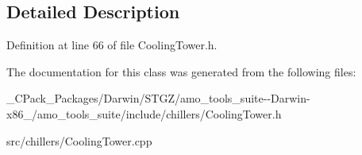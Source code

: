 \subsection{Detailed Description}


Definition at line 66 of file Cooling\+Tower.\+h.



The documentation for this class was generated from the following files\+:\begin{DoxyCompactItemize}
\item 
\+\_\+\+C\+Pack\+\_\+\+Packages/\+Darwin/\+S\+T\+G\+Z/amo\+\_\+tools\+\_\+suite-\/-\/\+Darwin-\/x86\+\_/amo\+\_\+tools\+\_\+suite/include/chillers/Cooling\+Tower.\+h\item 
src/chillers/Cooling\+Tower.\+cpp\end{DoxyCompactItemize}
